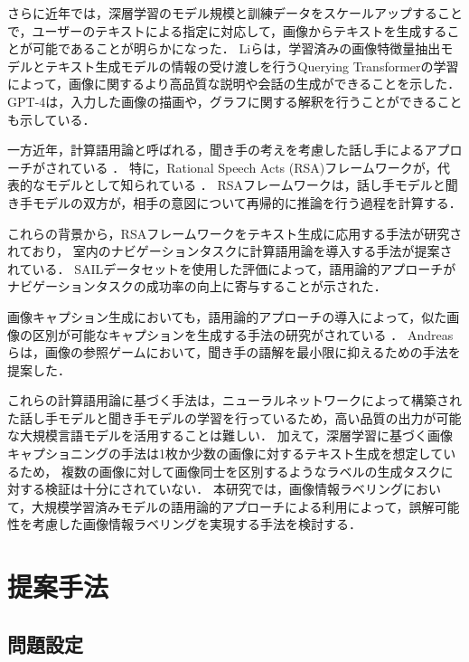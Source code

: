 \documentclass[a4paper,11pt]{jreport}
\begin{document}
さらに近年では，深層学習のモデル規模と訓練データをスケールアップすることで，ユーザーのテキストによる指定に対応して，画像からテキストを生成することが可能であることが明らかになった．
Liら\cite{Li2023}は，学習済みの画像特徴量抽出モデルとテキスト生成モデルの情報の受け渡しを行うQuerying Transformerの学習によって，画像に関するより高品質な説明や会話の生成ができることを示した．
GPT-4\cite{Bubeck2023}は，入力した画像の描画や，グラフに関する解釈を行うことができることも示している．

一方近年，計算語用論と呼ばれる，聞き手の考えを考慮した話し手によるアプローチがされている \cite{Fried2023}．
特に，Rational Speech Acts (RSA)フレームワークが，代表的なモデルとして知られている \cite{Frank2012,Goodman2016}．
RSAフレームワークは，話し手モデルと聞き手モデルの双方が，相手の意図について再帰的に推論を行う過程を計算する．

これらの背景から，RSAフレームワークをテキスト生成に応用する手法が研究されており\cite{Fried2017}，
室内のナビゲーションタスクに計算語用論を導入する手法が提案されている\cite{Williams2015}．
SAILデータセットを使用した評価によって，語用論的アプローチがナビゲーションタスクの成功率の向上に寄与することが示された．

画像キャプション生成においても，語用論的アプローチの導入によって，似た画像の区別が可能なキャプションを生成する手法の研究がされている \cite{Vedantam2017,Cohn-Gordon2018,Nie2020}．
Andreasら\cite{Andreas2016}は，画像の参照ゲームにおいて，聞き手の語解を最小限に抑えるための手法を提案した．

これらの計算語用論に基づく手法は，ニューラルネットワークによって構築された話し手モデルと聞き手モデルの学習を行っているため，高い品質の出力が可能な大規模言語モデルを活用することは難しい．
加えて，深層学習に基づく画像キャプショニングの手法は1枚か少数の画像に対するテキスト生成を想定しているため，
複数の画像に対して画像同士を区別するようなラベルの生成タスクに対する検証は十分にされていない．
本研究では，画像情報ラベリングにおいて，大規模学習済みモデルの語用論的アプローチによる利用によって，誤解可能性を考慮した画像情報ラベリングを実現する手法を検討する．

\chapter{提案手法}

\section{問題設定}
\end{document}

